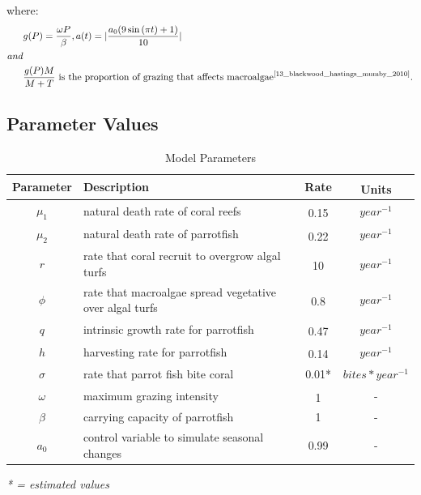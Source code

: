 \documentclass[12pt]{article}
\begin{document}
where: 
\begin{align*}
&g(P) = \frac{\omega P}{\beta}, a(t)=|\frac{a_{0}(9\sin{(\pi t) }+1)}{10}|\\
and\\
&\frac{g(P)M}{M + T} \text{ is the proportion of grazing that affects macroalgae} \textsuperscript{\cite{13_blackwood_hastings_mumby_2010}}.
\end{align*}


\subsection{Parameter Values}
\begin{table}[H]
    \centering
    \begin{tabular}{c p{9cm} c c}
        \hline
        Parameter & Description & Rate & Units\textsuperscript{\cite{12_noaa_report}\cite{04_mathanalysis}\cite{13_blackwood_hastings_mumby_2010}}\\
        \hline
        \hline
        $\mu_{1}$ & natural death rate of coral reefs & 0.15\textsuperscript{\cite{16_wolanski_richmond_mccook_2004}} & $year^{-1}$\\ %
        $\mu_{2}$ & natural death rate of parrotfish & 0.22\textsuperscript{\cite{12_noaa_report}} & $year^{-1}$\\ %
        $r$ & rate that coral recruit to overgrow algal turfs & 10\textsuperscript{\cite{16_wolanski_richmond_mccook_2004}} & $year^{-1}$\\ %
        $\phi$ & rate that macroalgae spread vegetative over algal turfs & 0.8\textsuperscript{\cite{11_zikkah_anggriani_supriatna_2020}} & $year^{-1}$\\ %
        $q$ & intrinsic growth rate for parrotfish & 0.47\textsuperscript{\cite{12_noaa_report}} & $year^{-1}$\\ %
        $h$ & harvesting rate for parrotfish & 0.14\textsuperscript{\cite{12_noaa_report}} & $year^{-1}$\\ %
        $\sigma$ & rate that parrot fish bite coral & 0.01*& $bites*year^{-1}$\\
        $\omega$ & maximum grazing intensity & 1\textsuperscript{\cite{13_blackwood_hastings_mumby_2010}} & -\\
        $\beta$ & carrying capacity of parrotfish & 1 & -\\
        $a_{0}$ & control variable to simulate seasonal changes & 0.99 & - \\%
        \hline
    \end{tabular}
    \caption{Model Parameters}
    \label{tab:parameters}
\end{table}
\textit{* = estimated values}
\end{document}
